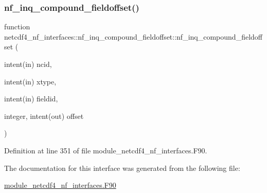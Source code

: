 \subsubsection{\texorpdfstring{nf\+\_\+inq\+\_\+compound\+\_\+fieldoffset()}{nf\_inq\_compound\_fieldoffset()}}
{\footnotesize\ttfamily function netcdf4\+\_\+nf\+\_\+interfaces\+::nf\+\_\+inq\+\_\+compound\+\_\+fieldoffset\+::nf\+\_\+inq\+\_\+compound\+\_\+fieldoffset (\begin{DoxyParamCaption}\item[{intent(in)}]{ncid,  }\item[{intent(in)}]{xtype,  }\item[{intent(in)}]{fieldid,  }\item[{integer, intent(out)}]{offset }\end{DoxyParamCaption})}



Definition at line 351 of file module\+\_\+netcdf4\+\_\+nf\+\_\+interfaces.\+F90.



The documentation for this interface was generated from the following file\+:\begin{DoxyCompactItemize}
\item 
\hyperlink{module__netcdf4__nf__interfaces_8F90}{module\+\_\+netcdf4\+\_\+nf\+\_\+interfaces.\+F90}\end{DoxyCompactItemize}
